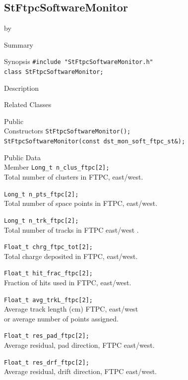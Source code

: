 \documentclass[twoside]{article}
\newcommand{\entrylabel}[1]{\mbox{\textbf{{#1}}}\hfil}%
\newenvironment{entry}
{\begin{list}{}%
    {\renewcommand{\makelabel}{\entrylabel}%
     \setlength{\labelwidth}{90pt}%
     \setlength{\leftmargin}{\labelwidth}
     \advance\leftmargin by \labelsep%
      }%
    }%
  {\end{list}}
\newcommand{\Entrylabel}[1]%
{\raisebox{0pt}[1ex][0pt]{\makebox[\labelwidth][l]%
    {\parbox[t]{\labelwidth}{\hspace{0pt}\textbf{{#1}}}}}}
\newenvironment{Entry}%
{\renewcommand{\entrylabel}{\Entrylabel}\begin{entry}}%
  {\end{entry}}
\begin{document}
\subsection{StFtpcSoftwareMonitor}
\label{sec:StFtpcSoftwareMonitor}
\begin{Entry}
\item[Summary]
\item[Synopsis]
    \verb+#include "StFtpcSoftwareMonitor.h"+\\
    \verb+class StFtpcSoftwareMonitor;+\\
\item[Description]
\item[Related Classes]
\item[Public\\ Constructors]
    \verb+StFtpcSoftwareMonitor();+\\

    \verb+StFtpcSoftwareMonitor(const dst_mon_soft_ftpc_st&);+\\
\item[Public Data\\ Member]
    \verb+Long_t n_clus_ftpc[2];+\\
    Total number of clusters in FTPC, east/west.
    
    \verb+Long_t n_pts_ftpc[2];+\\
    Total number of space points in FTPC, east/west.
    
    \verb+Long_t n_trk_ftpc[2];+\\
    Total number of tracks in FTPC east/west .
    
    \verb+Float_t chrg_ftpc_tot[2];+\\
    Total charge deposited in FTPC, east/west.
    
    \verb+Float_t hit_frac_ftpc[2];+\\
    Fraction of hits used in FTPC, east/west.
    
    \verb+Float_t avg_trkL_ftpc[2];+\\
    Average track length (cm) FTPC, east/west \\
    or average number of points assigned.
    
    \verb+Float_t res_pad_ftpc[2];+\\
    Average residual, pad direction, FTPC east/west.
    
    \verb+Float_t res_drf_ftpc[2];+\\
    Average residual, drift direction, FTPC east/west.
\end{Entry}
\clearpage
\end{document}
